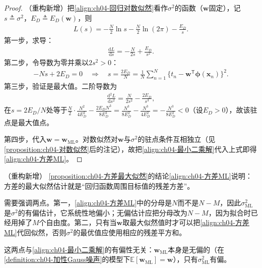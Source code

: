 \documentclass[../../main.tex]{subfiles}
\begin{document}
\begin{proof}
（重构新增）把\eqref{align:ch04-回归对数似然}看作$\sigma^2$的函数（$\boldsymbol{w}$固定），记$s\triangleq\sigma^2$，$E_D\triangleq E_D(\boldsymbol{w})$，则
\begin{align*}
  L(s)=-\frac{N}{2}\ln s-\frac{N}{2}\ln(2\pi)-\frac{E_D}{s}.
\end{align*}
第一步，求导：
\begin{align*}
  \frac{\mathrm{d}L}{\mathrm{d}s}=-\frac{N}{2s}+\frac{E_D}{s^2}.
\end{align*}
第二步，令导数为零并乘以$2s^2>0$：
\begin{align*}
  -Ns+2E_D=0\quad\Longrightarrow\quad s=\frac{2E_D}{N}
  =\frac{1}{N}\sum_{n=1}^{N}\bigl\{t_n-\boldsymbol{w}^{\mathsf{T}}\boldsymbol{\phi}(\boldsymbol{x}_n)\bigr\}^2 .
\end{align*}
第三步，验证是最大值。二阶导数为
\begin{align*}
  \frac{\mathrm{d}^2L}{\mathrm{d}s^2}=\frac{N}{2s^2}-\frac{2E_D}{s^3},
\end{align*}
在$s=2E_D/N$处等于$\frac{N}{2}\cdot\frac{N^2}{4E_D^2}-\frac{2E_DN^3}{8E_D^3}=\frac{N^3}{8E_D^2}-\frac{N^3}{4E_D^2}=-\frac{N^3}{8E_D^2}<0$（设$E_D>0$），故该驻点是最大值点。

第四步，代入$\boldsymbol{w}=\boldsymbol{w}_{\mathrm{ML}}$。对数似然对$\boldsymbol{w}$与$\sigma^2$的驻点条件互相独立（见\cref{proposition:ch04-对数似然}后的注记），故把\eqref{align:ch04-最小二乘解}代入上式即得\eqref{align:ch04-方差ML}。
\end{proof}

\begin{remark}（重构新增）
\cref{proposition:ch04-方差最大似然}的结论\eqref{align:ch04-方差ML}说明：方差的最大似然估计就是“回归函数周围目标值的残差方差”。

需要强调两点。第一，\eqref{align:ch04-方差ML}中的分母是$N$而不是$N-M$，因此$\sigma^2_{\mathrm{ML}}$是$\sigma^2$的有偏估计，它系统性地偏小；无偏估计应把分母改为$N-M$，因为拟合时已经用掉了$M$个自由度。第二，只有当$\boldsymbol{w}$取最大似然值时才可以把\eqref{align:ch04-方差ML}代回似然，否则$\sigma^2$的最优值应使用相应的残差平方和。

这两点与\eqref{align:ch04-最小二乘解}的有偏性无关：$\boldsymbol{w}_{\mathrm{ML}}$本身是无偏的（在\cref{definition:ch04-加性Gauss噪声}的模型下$\mathbb{E}[\boldsymbol{w}_{\mathrm{ML}}]=\boldsymbol{w}$），只有$\sigma^2_{\mathrm{ML}}$有偏。
\end{remark}
\end{document}
